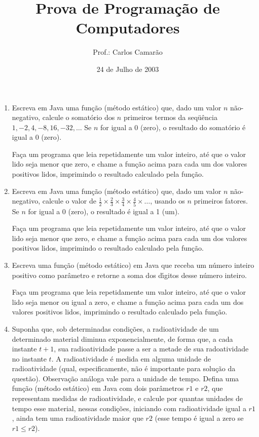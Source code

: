 \documentclass[brazil]{article}
\title{Prova de Programa\c{c}\~ao de Computadores}
\author{Prof.: Carlos Camar\~ao}
\date{24 de Julho de 2003}
\begin{document}
\maketitle

\begin{enumerate}

\item Escreva em Java uma fun\c{c}\~ao (m\'etodo est\'atico) que, dado
um valor $n$ n\~ao-negativo, calcule o somat\'orio dos $n$ primeiros
termos da seq\"u\^encia $1, - 2, 4, - 8, 16, - 32, \ldots$ Se $n$ for
igual a 0 (zero), o resultado do somat\'orio \'e igual a 0 (zero).

Fa\c{c}a um programa que leia repetidamente um valor inteiro, at\'e
que o valor lido seja menor que zero, e chame a fun\c{c}\~ao acima
para cada um dos valores positivos lidos, imprimindo o resultado
calculado pela fun\c{c}\~ao.

\item Escreva em Java uma fun\c{c}\~ao (m\'etodo est\'atico) que, dado
um valor $n$ n\~ao-negativo, calcule o valor de $\frac{1}{2} \times
\frac{2}{3} \times \frac{3}{4} \times \frac{4}{5} \times \ldots$,
usando os $n$ primeiros fatores. Se $n$ for igual a 0 (zero), o
resultado \'e igual a 1 (um).

Fa\c{c}a um programa que leia repetidamente um valor inteiro, at\'e
que o valor lido seja menor que zero, e chame a fun\c{c}\~ao acima
para cada um dos valores positivos lidos, imprimindo o resultado
calculado pela fun\c{c}\~ao.

\item Escreva uma fun\c{c}\~ao (m\'etodo est\'atico) em Java que
receba um n\'umero inteiro posi\-tivo como par\^ametro e retorne a
soma dos d\'{\i}gitos desse n\'umero inteiro.

Fa\c{c}a um programa que leia repetidamente um valor inteiro, at\'e
que o valor lido seja menor ou igual a zero, e chame a fun\c{c}\~ao
acima para cada um dos valores positivos lidos, imprimindo o resultado
calculado pela fun\c{c}\~ao.

\item Suponha que, sob determinadas condi\c{c}\~oes, a radioatividade
de um determinado material diminua exponencialmente, de forma que, a
cada instante $t+1$, sua radioatividade passe a ser a metade de sua
radoatividade no instante $t$. A radioatividade \'e medida em alguma
unidade de radioatividade (qual, especificamente, n\~ao \'e importante
para solu\c{c}\~ao da quest\~ao). Observa\c{c}\~ao an\'aloga vale para
a unidade de tempo. Defina uma fun\c{c}\~ao (m\'etodo est\'atico) em
Java com dois par\^ametros $r1$ e $r2$, que representam medidas de
radio\-a\-tividade, e calcule por quantas unidades de tempo esse
material, nessas condi\c{c}\~oes, iniciando com radioatividade igual a
$r1$, ainda tem uma radioatividade maior que $r2$ (esse tempo
\'e igual a zero se $r1 \leq r2$).


\end{enumerate}
\end{document}
